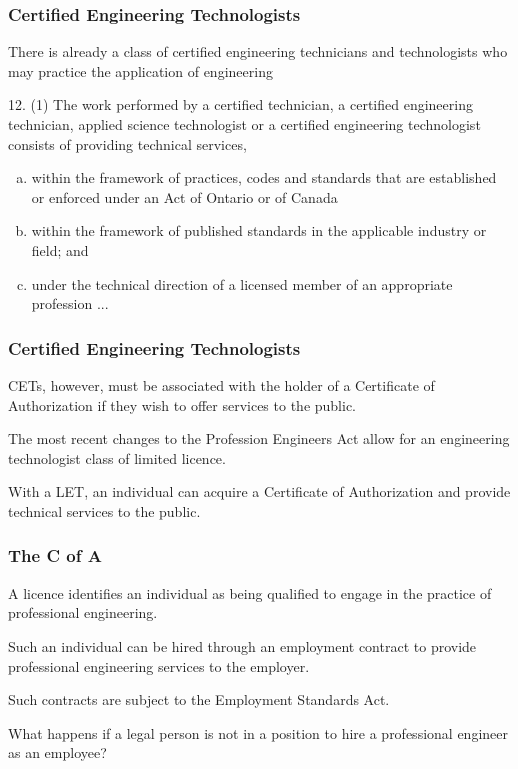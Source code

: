\begin{frame}
\frametitle{Certified Engineering Technologists}


There is already a class of certified engineering technicians and technologists who may practice
the application of engineering

12. (1) The work performed by a certified technician, a certified engineering technician, applied science technologist or a certified engineering technologist consists of providing technical services,
\begin{enumerate}[(a)]
\item within the framework of practices, codes and standards that are established or enforced under an Act of Ontario or of Canada
\item within the framework of published standards in the applicable industry or field; and 
\item under the technical direction of a licensed member of an appropriate profession ...
\end{enumerate}

\end{frame}



\begin{frame}
\frametitle{Certified Engineering Technologists}

CETs, however, must be associated with the holder of a Certificate of Authorization if they wish to offer services to the public.

The most recent changes to the Profession Engineers Act allow for an engineering technologist class of limited licence.

With a LET, an individual can acquire a Certificate of Authorization and provide technical services to the public.


\end{frame}



\begin{frame}
\frametitle{The C of A}

A licence identifies an individual as being qualified to engage in the practice of professional engineering.

Such an individual can be hired through an employment contract to provide professional engineering services to the employer.

Such contracts are subject to the Employment Standards Act.

What happens if a legal person is not in a position to hire a professional engineer as an employee?

\end{frame}



